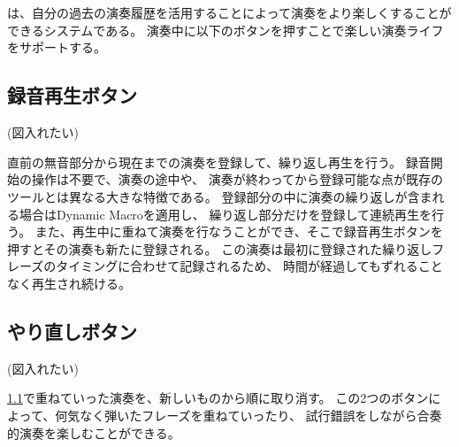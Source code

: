 \section{\system}
\label{repiano}

%

{\system}は、自分の過去の演奏履歴を活用することによって演奏をより楽しくすることができるシステムである。
演奏中に以下のボタンを押すことで楽しい演奏ライフをサポートする。

\subsection{録音再生ボタン}
\label{recplaybutton}
(図入れたい)

直前の無音部分から現在までの演奏を登録して、繰り返し再生を行う。
録音開始の操作は不要で、演奏の途中や、
演奏が終わってから登録可能な点が既存のツールとは異なる大きな特徴である。
登録部分の中に演奏の繰り返しが含まれる場合はDynamic Macro\cite{masui}を適用し、
繰り返し部分だけを登録して連続再生を行う。
また、再生中に重ねて演奏を行なうことができ、そこで録音再生ボタンを押すとその演奏も新たに登録される。
この演奏は最初に登録された繰り返しフレーズのタイミングに合わせて記録されるため、
時間が経過してもずれることなく再生され続ける。

\subsection{やり直しボタン}
(図入れたい)

\ref{recplaybutton}で重ねていった演奏を、新しいものから順に取り消す。
この2つのボタンによって、何気なく弾いたフレーズを重ねていったり、
試行錯誤をしながら合奏的演奏を楽しむことができる。

